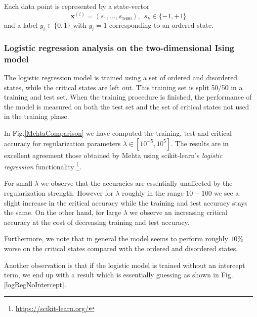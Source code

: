\documentclass[a4paper, twocolumn]{article}
\begin{document}
Each data point is represented by a state-vector 
\begin{equation}
 \mathbf{x}^{(i)} = (s_1, \dots,s_{1600}), \ \ s_k \in \{-1,+1\}
\end{equation}
and a label $y_i \in \{0,1\}$ with $y_i = 1$ corresponding to an ordered state.


\subsubsection{Logistic regression analysis on the two-dimensional Ising model}
The logistic regression model is trained using a set of ordered and disordered states, while the critical states are left out. 
This training set is split 50/50 in a training and test set. When the training procedure is finished, the performance of 
the model is measured on both the test set and the set of critical states not used in the training phase. 

In Fig.\ref{MehtaComparison} we have computed the training, test and critical accuracy for regularization parameters 
$\lambda \in [10^{-5},10^{5}]$. The results are in excellent agreement those obtained by Mehta using scikit-learn's \textit{logistic regression}
functionality \footnote{\href{https://scikit-learn.org/stable/modules/generated/sklearn.linear\_model.LogisticRegression.html}{https://scikit-learn.org/}}.

For small $\lambda$ we observe that the accuracies are essentially unaffected by the regularization strength. 
However for $\lambda$ roughly in the range $10-100$ we see a slight increase in the critical accuracy while the training and 
test accuracy stays the same. On the other hand, for large $\lambda$ we observe an increasing critical accuracy at the cost of 
decreasing training and test accuracy. 

Furthermore, we note that in general the model seems to perform roughly $10$\% worse on 
the critical states compared with the ordered and disordered states.  

Another observation is that if the logistic model is trained without an intercept term, we end up with a result 
which is essentially guessing as shown in Fig.\ref{logRegNoIntercept}.
\end{document}
